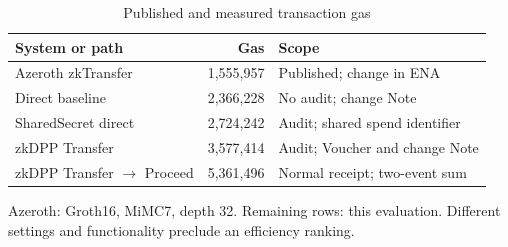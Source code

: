 \begin{table}[t]
\centering\small
\caption{Published and measured transaction gas}
\label{tab:eval-published}
\begin{tabularx}{\columnwidth}{@{}>{\raggedright\arraybackslash}p{24mm}rY@{}}
\toprule
System or path & Gas & Scope \\ \midrule
Azeroth zkTransfer~\cite{jeong-azeroth-2023} & 1,555,957 & Published; change in ENA \\
Direct baseline & 2,366,228 & No audit; change Note \\
SharedSecret direct & 2,724,242 & Audit; shared spend identifier \\
zkDPP Transfer & 3,577,414 & Audit; Voucher and change Note \\
zkDPP Transfer $\to$ Proceed & 5,361,496 & Normal receipt; two-event sum \\
\bottomrule
\end{tabularx}
\par\smallskip\begin{minipage}{\columnwidth}\footnotesize Azeroth: Groth16, MiMC7, depth 32. Remaining rows: this evaluation. Different settings and functionality preclude an efficiency ranking.\end{minipage}
\end{table}
